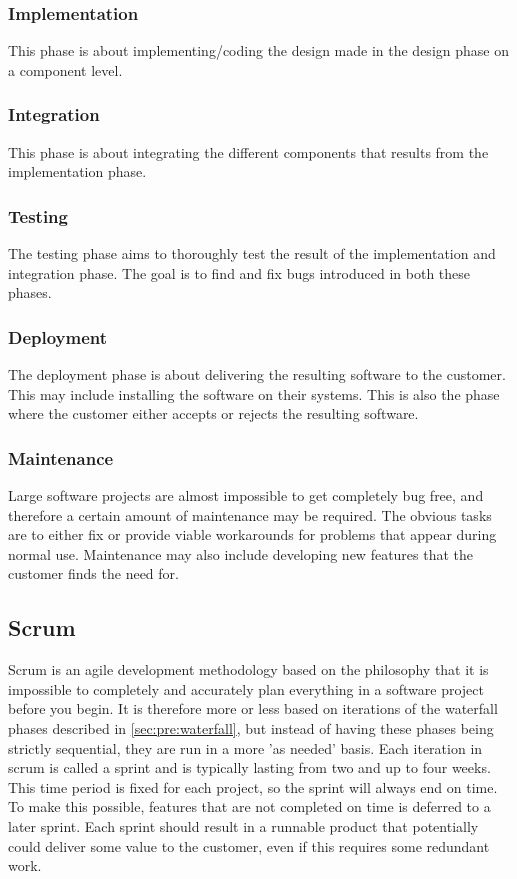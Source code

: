 \subsubsection{Implementation}
This phase is about implementing/coding the design made in the design phase on
a component level.

\subsubsection{Integration}
This phase is about integrating the different components that results from the
implementation phase.

\subsubsection{Testing}
The testing phase aims to thoroughly test the result of the implementation and
integration phase. The goal is to find and fix bugs introduced in both these
phases.

\subsubsection{Deployment}
The deployment phase is about delivering the resulting software to the
customer. This may include installing the software on their systems. This is
also the phase where the customer either accepts or rejects the resulting
software.

\subsubsection{Maintenance}
Large software projects are almost impossible to get completely bug free, and
therefore a certain amount of maintenance may be required. The obvious tasks
are to either fix or provide viable workarounds for problems that appear during
normal use. Maintenance may also include developing new features that the
customer finds the need for.

\subsection{Scrum}
\label{sec:pre:scrum}
Scrum is an agile development methodology based on the philosophy that it is
impossible to completely and accurately plan everything in a software project
before you begin. It is therefore more or less based on iterations of the
waterfall phases described in \autoref{sec:pre:waterfall}, but instead of
having these phases being strictly sequential, they are run in a more
'as needed' basis. Each iteration in scrum is called a sprint and is typically
lasting from two and up to four weeks. This time period is fixed for each
project, so the sprint will always end on time. To make this possible, features
that are not completed on time is deferred to a later sprint. Each sprint
should result in a runnable product that potentially could deliver some value
to the customer, even if this requires some redundant work.

